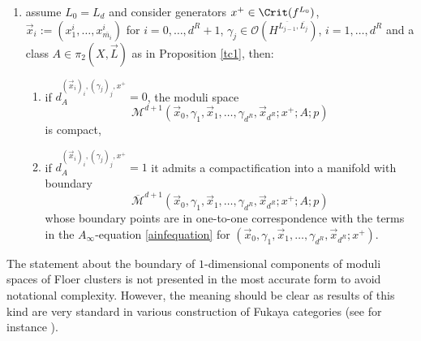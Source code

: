 \begin{prop}
\begin{enumerate}
			\item assume $L_0=L_d$ and consider generators $x^+\in \Crit(f^{L_0})$, $\vec{x}_i:=(x_1^i,\ldots,x_{\overline{m_i}}^i)$ for $i=0,\ldots,d^R+1$, $\gamma_j\in \mathcal{O}\left(H^{\overline{L_{j-1}},\overline{L_j}}\right)$, $i=1,\ldots,d^R$ and a class $A\in \pi_2(X,\vec{L})$ as in Proposition \ref{tc1}, then:
			\begin{enumerate}
				\item if $d_{A}^{(\vec{x}_i)_i, (\gamma_j)_j,x^+}=0$, the moduli space $$\mathcal{M}^{d+1}\left(\vec{x}_0, \gamma_1, \vec{x}_1,\ldots,\gamma_{d^R}, \vec{x}_{d^R}; x^+;A;p\right)$$ is compact,
				\item if $d_{A}^{(\vec{x}_i)_i, (\gamma_j)_j,x^+}=1$ it admits a compactification into a manifold with boundary $$\overline{\mathcal{M}}^{d+1}\left(\vec{x}_0, \gamma_1, \vec{x}_1,\ldots,\gamma_{d^R}, \vec{x}_{d^R}; x^+;A;p\right)$$  whose boundary points are in one-to-one correspondence with the terms in the $A_\infty$-equation \ref{ainfequation} for $(\vec{x}_0, \gamma_1, \vec{x}_1,\ldots,\gamma_{d^R}, \vec{x}_{d^R}; x^+)$.
			\end{enumerate}
		\end{enumerate}
	\end{prop}
	\begin{rem}
		The statement about the boundary of $1$-dimensional components of moduli spaces of Floer clusters is not presented in the most accurate form to avoid notational complexity. However, the meaning should be clear as results of this kind are very standard in various construction of Fukaya categories (see for instance \cite[Section 9l]{Se:book-fukaya-categ}).
	\end{rem}

